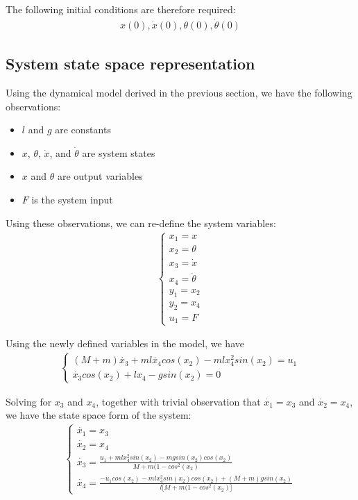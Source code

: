 \documentclass [12pt,letterpaper]{exam}
\begin{document}
The following initial conditions are therefore required:
\begin{align}
x(0), \dot{x}(0), \theta(0), \dot{\theta}(0)
\end{align}

\subsection{System state space representation}
Using the dynamical model derived in the previous section, we have the following observations:

\begin{itemize}
    \item $l$ and $g$ are constants
    \item $x$, $\theta$, $\dot{x}$, and $\dot{\theta}$ are system states
    \item $x$ and $\theta$ are output variables
    \item $F$ is the system input
\end{itemize}

Using these observations, we can re-define the system variables:
\begin{align}
\begin{cases}
x_1 = x \\
x_2 = \theta \\
x_3 = \dot{x} \\
x_4 = \dot{\theta} \\
y_1 = x_2 \\
y_2 = x_4 \\
u_1 = F
\end{cases}
\end{align}

Using the newly defined variables in the model, we have
\begin{align}
\begin{cases}
(M + m)\dot{x_3} + ml\dot{x_4}cos(x_2) - mlx_4^2sin(x_2) = u_1 \\
\dot{x_3}cos(x_2) + lx_4 - gsin(x_2) = 0
\end{cases}
\end{align}

Solving for $x_3$ and $x_4$, together with trivial observation that $\dot{x_1} = x_3$ and $\dot{x_2} = x_4$, we have the state space form of the system:
\begin{align}
\begin{cases}
\dot{x_1} = x_3 \\
\dot{x_2} = x_4 \\
\dot{x_3} = \frac{u_1 + mlx_4^2sin(x_2) - mgsin(x_2)cos(x_2)}{M + m(1 - cos^{2}(x_2)} \\
\dot{x_4} = \frac{-u_1cos(x_2) - mlx_4^2sin(x_2)cos(x_2) + (M + m)gsin(x_2)}{l\big[M + m(1 - cos^{2}(x_2)\big]}
\end{cases}
\end{align}
\end{document}
